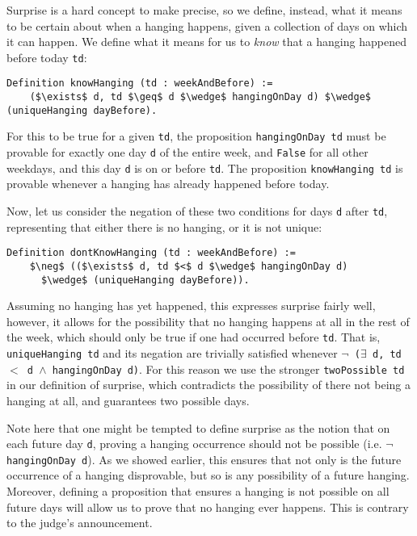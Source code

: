 \documentclass[runningheads]{llncs}
\begin{document}
Surprise is a hard concept to make precise, so we define, instead, what it means to be certain about
when a hanging happens, given a collection of days on which it can happen.
We define what it means for us to \emph{know} that a hanging happened before today {\tt td}:

\begin{lstlisting}[mathescape=true]
  Definition knowHanging (td : weekAndBefore) :=
    ($\exists$ d, td $\geq$ d $\wedge$ hangingOnDay d) $\wedge$ (uniqueHanging dayBefore).
\end{lstlisting}

For this to be true for a given {\tt td}, the proposition
{\tt hangingOnDay td} must be provable
for exactly one day {\tt d} of the entire week, and {\tt False} for all other
 weekdays, and this day {\tt d} is
on or before {\tt td}.
The proposition {\tt knowHanging td} is provable whenever a hanging has already
happened before today.

Now, let us consider the negation of these two conditions for days {\tt d} after
{\tt td}, representing that either there is no hanging, or it is not unique:

\begin{lstlisting}[mathescape=true]
  Definition dontKnowHanging (td : weekAndBefore) :=
    $\neg$ (($\exists$ d, td $<$ d $\wedge$ hangingOnDay d)
      $\wedge$ (uniqueHanging dayBefore)).
\end{lstlisting}

Assuming no hanging has yet happened, this expresses surprise fairly
well, however, it allows for the possibility that no hanging happens at all in the
rest of the week, which should only be true if one had occurred before {\tt td}.
That is, {\tt uniqueHanging td} and its negation are trivially
satisfied whenever {\tt $\neg$ ($\exists$ d, td $<$ d $\wedge$ hangingOnDay d)}. For this
reason we use the stronger {\tt twoPossible td} in our definition of surprise,
which contradicts the possibility of there not being a hanging at all, and
guarantees two possible days.

Note here that one might be tempted to define surprise as the notion that on each future day {\tt d}, proving a hanging
occurrence should not be possible (i.e. {\tt $\neg$ hangingOnDay d}).
As we showed earlier, this ensures that not only is the future occurrence of a hanging
disprovable, but so is any possibility of a future hanging.
Moreover, defining a proposition that ensures a hanging is not possible on all
future days will allow us to prove that no hanging ever happens.
This is contrary to the judge's announcement.
\end{document}
